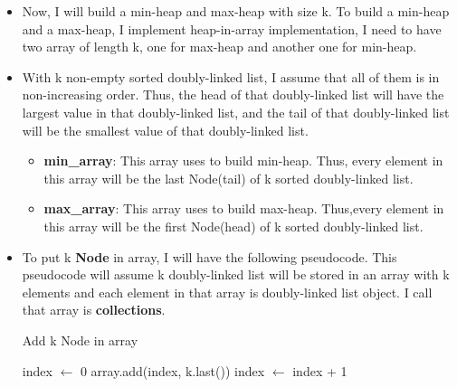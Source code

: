 \documentclass{article}
\begin{document}
	\begin{itemize}
		\item Now, I will build a min-heap and max-heap with size k. To build a min-heap and a max-heap, I implement heap-in-array implementation, I need to have two array of length k, one for max-heap and another one for min-heap.


		\item With k non-empty sorted doubly-linked list, I assume that all of them is in non-increasing order. Thus, the head of that doubly-linked list will have the largest value in that doubly-linked list, and the tail of that doubly-linked list will be the smallest value of that doubly-linked list.
		\begin{itemize}
			\item \textbf{min\_array}: This array uses to build min-heap. Thus, every element in this array will be the last Node(tail) of k sorted doubly-linked list.
			\item \textbf{max\_array}: This array uses to build max-heap. Thus,every element in this array will be the first Node(head) of k sorted doubly-linked list.
		\end{itemize}
		
		\item To put k \textbf{Node} in array, I will have the following pseudocode. This pseudocode will assume k doubly-linked list will be stored in an array with k elements and each element in that array is doubly-linked list object. I call that array is \textbf{collections}.


		\begin{algorithm}[H]
			\caption{Add k Node in array}
		\begin{algorithmic}[1]
			\State index \(\leftarrow\) 0
				\State array.add(index, k.last())
				\State index \(\gets\) index + 1
			\EndFor{}
			\State {}
			\EndFunction{}
		\end{algorithmic}
		\end{algorithm}


\end{itemize}
\end{document}
